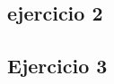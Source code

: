 \documentclass[spanish,openany]{report}
\begin{document}
	\subsection*{ejercicio 2}



	\subsection*{Ejercicio 3}












\end{document}
